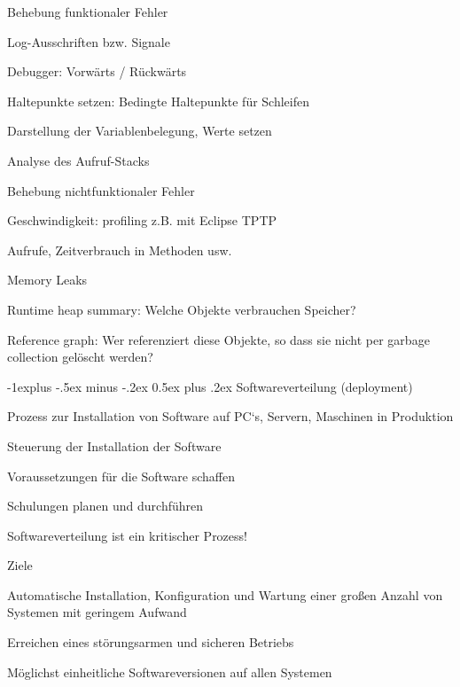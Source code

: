 \documentclass[a4paper]{article}
\makeatletter
\renewcommand{\subsection}{\@startsection{subsection}{2}{0mm}%
                                {-1explus -.5ex minus -.2ex}%
                                {0.5ex plus .2ex}%
                                {\normalfont\normalsize\bfseries}}
\makeatother
\begin{document}
\begin{multicols}{3}
  Behebung funktionaler Fehler
  \begin{itemize*}
    \item Log-Ausschriften bzw. Signale
    \item Debugger: Vorwärts / Rückwärts
    \item Haltepunkte setzen: Bedingte Haltepunkte für Schleifen
    \item Darstellung der Variablenbelegung, Werte setzen
    \item Analyse des Aufruf-Stacks
  \end{itemize*}

  Behebung nichtfunktionaler Fehler
  \begin{itemize*}
    \item Geschwindigkeit: profiling z.B. mit Eclipse TPTP
    \item Aufrufe, Zeitverbrauch in Methoden usw.
  \end{itemize*}

  Memory Leaks
  \begin{itemize*}
    \item Runtime heap summary: Welche Objekte verbrauchen Speicher?
    \item Reference graph: Wer referenziert diese Objekte, so dass sie nicht per garbage collection gelöscht werden?
  \end{itemize*}

  \subsection{Softwareverteilung (deployment)}
  \begin{itemize*}
    \item Prozess zur Installation von Software auf PC‘s, Servern, Maschinen in Produktion
    \item Steuerung der Installation der Software
    \item Voraussetzungen für die Software schaffen
    \begin{itemize*}
      \item Schulungen planen und durchführen
    \end{itemize*}
    \item Softwareverteilung ist ein kritischer Prozess!
    \item Ziele
    \begin{itemize*}
      \item Automatische Installation, Konfiguration und Wartung einer großen Anzahl von Systemen mit geringem Aufwand
      \item Erreichen eines störungsarmen und sicheren Betriebs
      \item Möglichst einheitliche Softwareversionen auf allen Systemen
    \end{itemize*}
  \end{itemize*}


\end{multicols}
\end{document}
